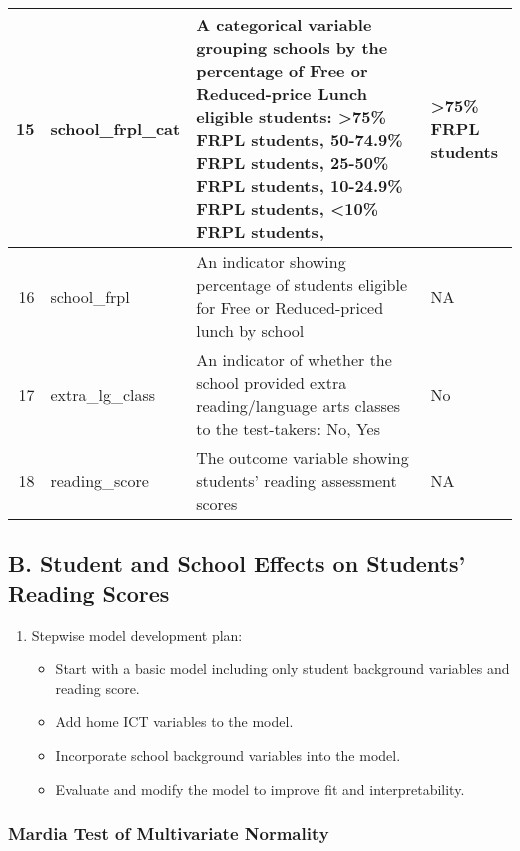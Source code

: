 \documentclass[
]{article}
\providecommand{\tightlist}{%
  \setlength{\itemsep}{0pt}\setlength{\parskip}{0pt}}
\begin{document}
\begin{table}
\begin{tabular}[t]{r|l|l|l}
\hline
15 & school\_frpl\_cat & A categorical variable grouping schools by the percentage of Free or Reduced-price Lunch eligible students: >75\% FRPL students, 50-74.9\% FRPL students, 25-50\% FRPL students, 10-24.9\% FRPL students, <10\% FRPL students, & >75\% FRPL students\\
\hline
16 & school\_frpl & An indicator showing percentage of students eligible for Free or Reduced-priced lunch by school & NA\\
\hline
17 & extra\_lg\_class & An indicator of whether the school provided extra reading/language arts classes to the test-takers: No, Yes & No\\
\hline
18 & reading\_score & The outcome variable showing students' reading assessment scores & NA\\
\hline
\end{tabular}
\end{table}

\hypertarget{b.-student-and-school-effects-on-students-reading-scores}{%
\subsection{B. Student and School Effects on Students' Reading
Scores}\label{b.-student-and-school-effects-on-students-reading-scores}}

\begin{enumerate}
\def\labelenumi{\arabic{enumi}.}
\tightlist
\item
  Stepwise model development plan:

  \begin{itemize}
  \tightlist
  \item
    Start with a basic model including only student background variables
    and reading score.
  \item
    Add home ICT variables to the model.
  \item
    Incorporate school background variables into the model.
  \item
    Evaluate and modify the model to improve fit and interpretability.
  \end{itemize}
\end{enumerate}

\hypertarget{mardia-test-of-multivariate-normality}{%
\subsubsection{Mardia Test of Multivariate
Normality}\label{mardia-test-of-multivariate-normality}}
\end{document}
